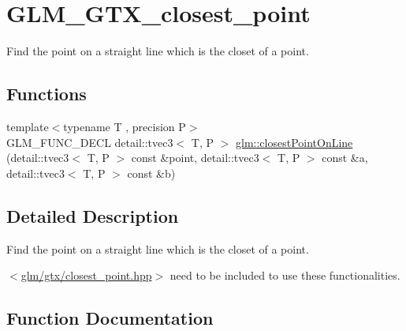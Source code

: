 \hypertarget{group__gtx__closest__point}{}\section{G\+L\+M\+\_\+\+G\+T\+X\+\_\+closest\+\_\+point}
\label{group__gtx__closest__point}


Find the point on a straight line which is the closet of a point.  


\subsection*{Functions}
\begin{DoxyCompactItemize}
\item 
{\footnotesize template$<$typename T , precision P$>$ }\\G\+L\+M\+\_\+\+F\+U\+N\+C\+\_\+\+D\+E\+CL detail\+::tvec3$<$ T, P $>$ \hyperlink{group__gtx__closest__point_ga03a6d7e93590f5d45050f6dc7aa8bf8f}{glm\+::closest\+Point\+On\+Line} (detail\+::tvec3$<$ T, P $>$ const \&point, detail\+::tvec3$<$ T, P $>$ const \&a, detail\+::tvec3$<$ T, P $>$ const \&b)
\end{DoxyCompactItemize}


\subsection{Detailed Description}
Find the point on a straight line which is the closet of a point. 

$<$\hyperlink{closest__point_8hpp_source}{glm/gtx/closest\+\_\+point.\+hpp}$>$ need to be included to use these functionalities. 

\subsection{Function Documentation}

